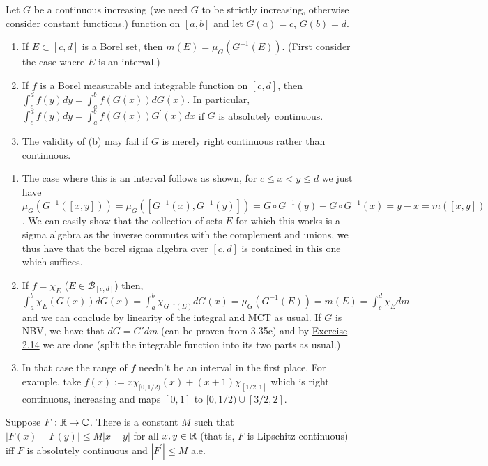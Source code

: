 \documentclass[12pt,a4paper]{article}
\begin{document}
\begin{problem}\label{prob:3-36}
Let $G$ be a continuous increasing (we need $G$ to be strictly increasing, otherwise consider constant functions.) function on $[a, b]$ and let $G(a)=c$, $G(b)=d.$
\begin{enumerate}[label=\alph*.]
    \item If $E\subset[c,d]$ is a Borel set, then $m(E)=\mu_{G}(G^{-1}(E)).$ (First consider the case where $E$ is an interval.)
    \item If $f$ is a Borel measurable and integrable function on $[c, d]$, then $\int_{c}^{d}f(y)dy=\int_{a}^{b}f(G(x))dG(x)$. In particular, $\int_{c}^{d}f(y)dy=\int_{a}^{b}f(G(x))G^{\prime}(x)dx$ if $G$ is absolutely continuous.
    \item The validity of (b) may fail if $G$ is merely right continuous rather than continuous.
\end{enumerate}
\end{problem}
\begin{solution}
\begin{enumerate}[label=\alph*.]
    \item The case where this is an interval follows as shown, for $c\leq x<y\leq d$ we just have $\mu_G(G^{-1}([x,y]))=\mu_G([G^{-1}(x),G^{-1}(y)])=G\circ G^{-1}(y)-G\circ G^{-1}(x)=y-x=m([x,y])$. 
        We can easily show that the collection of sets $E$ for which this works is a sigma algebra as the inverse commutes with the complement and unions, we thus have that the borel sigma algebra over $[c,d]$ is contained in this one which suffices.
    \item If $f=\chi_E$ ($E\in\mathcal B_{[c,d]}$) then, $\int_a^b\chi_E(G(x))dG(x)=\int_a^b\chi_{G^{-1}(E)}dG(x)=\mu_G(G^{-1}(E))=m(E)=\int_c^d\chi_Edm$ and we can conclude by linearity of the integral and MCT as usual. 
       If $G$ is NBV, we have that $dG=G'dm$ (can be proven from 3.35c) and by \hyperref[prob:2.14]{Exercise 2.14} we are done (split the integrable function into its two parts as usual.)
   \item In that case the range of $f$ needn't be an interval in the first place. 
       For example, take $f(x):=x\chi_{[0,1/2)}(x)+(x+1)\chi_{[1/2,1]}$ which is right continuous, increasing and maps $[0,1]$ to $[0,1/2)\cup[3/2,2].$
\end{enumerate}
\end{solution}
\begin{problem}\label{prob:3-37}
Suppose $F:\mathbb{R}\rightarrow\mathbb{C}$. There is a constant $M$ such that $|F(x)-F(y)|\le M|x-y|$ for all $x,y\in\mathbb{R}$ (that is, $F$ is Lipschitz continuous) iff $F$ is absolutely continuous and $|F^{\prime}|\le M$ a.e.
\end{problem}
\end{document}
